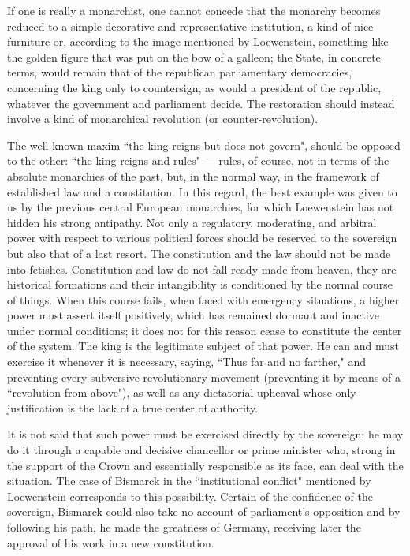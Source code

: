 If one is really a monarchist, one cannot concede that the monarchy becomes reduced to a simple decorative and representative institution, a kind of nice furniture or, according to the image mentioned by Loewenstein, something like the golden figure that was put on the bow of a galleon; the State, in concrete terms, would remain that of the republican parliamentary democracies, concerning the king only to countersign, as would a president of the republic, whatever the government and parliament decide. The restoration should instead involve a kind of monarchical revolution (or counter-revolution).

The well-known maxim ``the king reigns but does not govern", should be opposed to the other: ``the king reigns and rules" — rules, of course, not in terms of the absolute monarchies of the past, but, in the normal way, in the framework of established law and a constitution. In this regard, the best example was given to us by the previous central European monarchies, for which Loewenstein has not hidden his strong antipathy. Not only a regulatory, moderating, and arbitral power with respect to various political forces should be reserved to the sovereign but also that of a last resort. The constitution and the law should not be made into fetishes. Constitution and law do not fall ready-made from heaven, they are historical formations and their intangibility is conditioned by the normal course of things. When this course fails, when faced with emergency situations, a higher power must assert itself positively, which has remained dormant and inactive under normal conditions; it does not for this reason cease to constitute the center of the system. The king is the legitimate subject of that power. He can and must exercise it whenever it is necessary, saying, ``Thus far and no farther," and preventing every subversive revolutionary movement (preventing it by means of a ``revolution from above"), as well as any dictatorial upheaval whose only justification is the lack of a true center of authority.

It is not said that such power must be exercised directly by the sovereign; he may do it through a capable and decisive chancellor or prime minister who, strong in the support of the Crown and essentially responsible as its face, can deal with the situation. The case of Bismarck in the ``institutional conflict" mentioned by Loewenstein corresponds to this possibility. Certain of the confidence of the sovereign, Bismarck could also take no account of parliament's opposition and by following his path, he made the greatness of Germany, receiving later the approval of his work in a new constitution.

